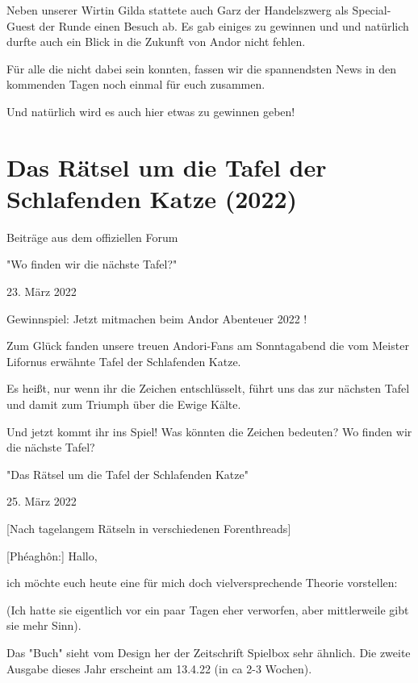 \documentclass[10pt, a4paper, oneside]{book}
\newcommand{\fillbreak}{\vspace*{\fill}\columnbreak}
\newcommand{\storytext}[1]{%
    \section{#1}%
    \label{Storytext: #1}%
}
\newcommand{\bildmitts}[2][height=0.32\textwidth,width=0.48\textwidth,keepaspectratio]{%
    \begin{center}
        \texttt{[image: Chronik der Andorversen/Bilder/\#2]}
    \end{center}
}
\begin{document}
\begin{multicols}{2}
Neben unserer Wirtin Gilda stattete auch Garz der Handelszwerg als Special-Guest der Runde einen Besuch ab. Es gab einiges zu gewinnen und und natürlich durfte auch ein Blick in die Zukunft von Andor nicht fehlen.

Für alle die nicht dabei sein konnten, fassen wir die spannendsten News in den kommenden Tagen noch einmal für euch zusammen.

Und natürlich wird es auch hier etwas zu gewinnen geben!





\fillbreak
\storytext{Das Rätsel um die Tafel der Schlafenden Katze (2022)}

\begin{center}
    Beiträge aus dem offiziellen Forum

    "Wo finden wir die nächste Tafel?"

    23. März 2022
\end{center}


Gewinnspiel: Jetzt mitmachen beim Andor Abenteuer 2022 !

Zum Glück fanden unsere treuen Andori-Fans am Sonntagabend die vom Meister Lifornus erwähnte Tafel der Schlafenden Katze.

Es heißt, nur wenn ihr die Zeichen entschlüsselt, führt uns das zur nächsten Tafel und damit zum Triumph über die Ewige Kälte.

Und jetzt kommt ihr ins Spiel! Was könnten die Zeichen bedeuten? Wo finden wir die nächste Tafel?








\begin{center}
    "Das Rätsel um die Tafel der Schlafenden Katze"

    25. März 2022
\end{center}

[Nach tagelangem Rätseln in verschiedenen Forenthreads]

[Phéaghôn:] Hallo,

ich möchte euch heute eine für mich doch vielversprechende Theorie vorstellen:

(Ich hatte sie eigentlich vor ein paar Tagen eher verworfen, aber mittlerweile gibt sie mehr Sinn).

Das "Buch" sieht vom Design her der Zeitschrift Spielbox sehr ähnlich. Die zweite Ausgabe dieses Jahr erscheint am 13.4.22 (in ca 2-3 Wochen).


\end{multicols}
\end{document}

